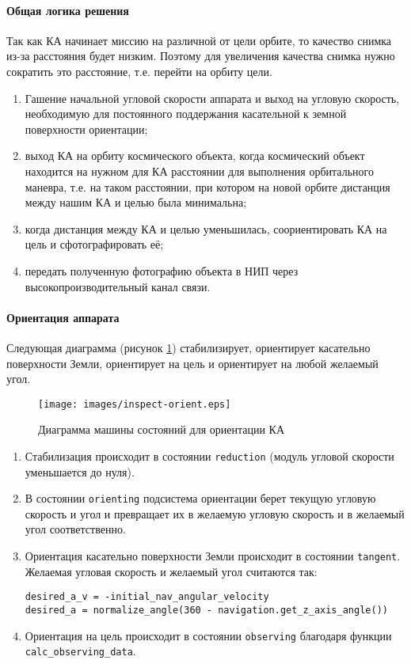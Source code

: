 \documentclass[12pt,a4paper]{article}
\begin{document}
\paragraph{Общая логика решения} 

Так как КА начинает миссию на различной от цели орбите, то качество снимка из-за расстояния будет низким. Поэтому для увеличения качества снимка нужно сократить это расстояние, т.е. перейти на орбиту цели.

\begin{enumerate}
\item Гашение начальной угловой скорости аппарата и выход на угловую скорость, необходимую для постоянного поддержания касательной к земной поверхности ориентации;
\item выход КА на орбиту космического объекта, когда космический объект находится на нужном для КА расстоянии для выполнения орбитального маневра, т.е. на таком расстоянии, при котором на новой орбите дистанция между нашим КА и целью была минимальна;
\item когда дистанция между КА и целью уменьшилась, соориентировать КА на цель и сфотографировать её;
\item передать полученную фотографию объекта в НИП через высокопроизводительный канал связи.
\end{enumerate}

\paragraph{Ориентация аппарата} Следующая диаграмма (рисунок \ref{Pic:INSPECT-orient}) стабилизирует, ориентирует касательно поверхности Земли, ориентирует на цель и ориентирует на любой желаемый угол.

\begin{figure}[tbh]
  \begin{center}
    \texttt{[image: images/inspect-orient.eps]}
    \caption{Диаграмма машины состояний для ориентации КА}
    \label{Pic:INSPECT-orient}
  \end{center}
\end{figure}

\begin{enumerate}
\item Стабилизация происходит в состоянии \verb'reduction' (модуль угловой скорости уменьшается до нуля).

\item В состоянии \verb'orienting' подсистема ориентации берет текущую угловую скорость и угол и превращает их в желаемую угловую скорость и в желаемый угол соответственно.

\item Ориентация касательно поверхности Земли происходит в состоянии \verb'tangent'. Желаемая угловая скорость и желаемый угол считаются так:
\begin{verbatim}
desired_a_v = -initial_nav_angular_velocity
desired_a = normalize_angle(360 - navigation.get_z_axis_angle())
\end{verbatim}
\item Ориентация на цель происходит в состоянии \verb'observing' благодаря функции \verb'calc_observing_data'.
\end{enumerate}
\end{document}
